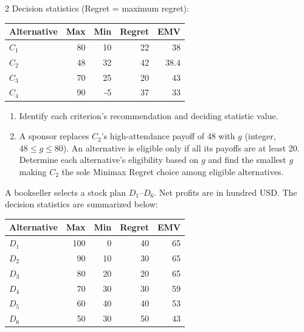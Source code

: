 \begin{multicols}{2}
		Decision statistics (Regret = maximum regret):
		
		\begin{center}\small\setlength{\tabcolsep}{4pt}
			\begin{tabular}{lrrrr}\toprule
				Alternative & Max & Min & Regret & EMV\\ \midrule
				$C_1$ & 80 & 10 & 22 & 38\\
				$C_2$ & 48 & 32 & 42 & 38.4\\
				$C_3$ & 70 & 25 & 20 & 43\\
				$C_4$ & 90 & -5 & 37 & 33\\
				\bottomrule
			\end{tabular}
		\end{center}
		
		\begin{enumerate}[label=\textbf{(\alph*)},leftmargin=*]
			\item Identify each criterion's recommendation and deciding statistic value. 
			
			\item A sponsor replaces $C_2$'s high-attendance payoff of 48 with $g$ (integer, $48\leq g\leq80$). An alternative is eligible only if all its payoffs are at least 20. Determine each alternative's eligibility based on $g$ and find the smallest $g$ making $C_2$ the sole Minimax Regret choice among eligible alternatives. 
		\end{enumerate}
		
		
		A bookseller selects a stock plan $D_1$--$D_6$. Net profits are in hundred USD. The decision statistics are summarized below:
		
		\vspace{-3mm}
		\begin{center}\small\setlength{\tabcolsep}{4pt}
			\begin{tabular}{lrrrr}\toprule
				Alternative & Max & Min & Regret & EMV\\ \midrule
				$D_1$ & 100 & 0 & 40 & 65\\
				$D_2$ & 90 & 10 & 30 & 65\\
				$D_3$ & 80 & 20 & 20 & 65\\
				$D_4$ & 70 & 30 & 30 & 59\\
				$D_5$ & 60 & 40 & 40 & 53\\
				$D_6$ & 50 & 30 & 50 & 43\\
				\bottomrule
			\end{tabular}
		\end{center}
		\vspace{-3mm}
		

\end{multicols}
